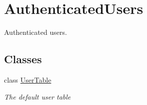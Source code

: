 \hypertarget{classOTA_1_1Data_1_1AuthenticatedUsers}{}\section{Authenticated\+Users}
\label{classOTA_1_1Data_1_1AuthenticatedUsers}


Authenticated users.  


\subsection*{Classes}
\begin{DoxyCompactItemize}
\item 
class \hyperlink{classOTA_1_1Data_1_1AuthenticatedUsers_1_1UserTable}{User\+Table}
\begin{DoxyCompactList}\small\item\em The default user table \end{DoxyCompactList}\end{DoxyCompactItemize}
